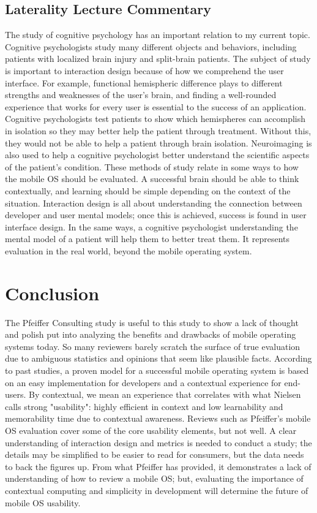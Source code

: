 \documentclass[11pt]{article}
\begin{document}
\subsection{Laterality Lecture Commentary}
The study of cognitive psychology has an important relation to my current topic. Cognitive psychologists study many different objects and behaviors, including patients with localized brain injury and split-brain patients. The subject of study is important to interaction design because of how we comprehend the user interface. For example, functional hemispheric difference plays to different strengths and weaknesses of the user's brain, and finding a well-rounded experience that works for every user is essential to the success of an application. Cognitive psychologists test patients to show which hemispheres can accomplish in isolation so they may better help the patient through treatment. Without this, they would not be able to help a patient through brain isolation. Neuroimaging is also used to help a cognitive psychologist better understand the scientific aspects of the patient's condition. These methods of study relate in some ways to how the mobile OS should be evaluated. A successful brain should be able to think contextually, and learning should be simple depending on the context of the situation. Interaction design is all about understanding the connection between developer and user mental models; once this is achieved, success is found in user interface design. In the same ways, a cognitive psychologist understanding the mental model of a patient will help them to better treat them. It represents evaluation in the real world, beyond the mobile operating system.
\section{Conclusion}
The Pfeiffer Consulting study is useful to this study to show a lack of thought and polish put into analyzing the benefits and drawbacks of mobile operating systems today. So many reviewers barely scratch the surface of true evaluation due to ambiguous statistics and opinions that seem like plausible facts. According to past studies, a proven model for a successful mobile operating system is based on an easy implementation for developers and a contextual experience for end-users. By contextual, we mean an experience that correlates with what Nielsen calls strong "usability": highly efficient in context and low learnability and memorability time due to contextual awareness. Reviews such as Pfeiffer's mobile OS evaluation cover some of the core usability elements, but not well. A clear understanding of interaction design and metrics is needed to conduct a study; the details may be simplified to be easier to read for consumers, but the data needs to back the figures up. From what Pfeiffer has provided, it demonstrates a lack of understanding of how to review a mobile OS; but, evaluating the importance of contextual computing and simplicity in development will determine the future of mobile OS usability.


\end{document}
